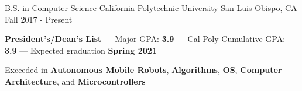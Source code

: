 

\begin{cventries}

  \cventry
    {B.S. in Computer Science} %
    {California Polytechnic University} %
    {San Luis Obispo, CA} %
    {Fall 2017 - Present} %
    {
      \begin{cvitems} %
        \item {\textbf{President's/Dean's List} --- Major GPA: \textbf{3.9} --- Cal Poly Cumulative GPA: \textbf{3.9}} --- Expected graduation \textbf{Spring 2021}
        \item {Exceeded in \textbf {Autonomous Mobile Robots}, \textbf{Algorithms}, \textbf{OS}, \textbf{Computer Architecture}, and \textbf{Microcontrollers}}
      \end{cvitems}
    }

\end{cventries}
